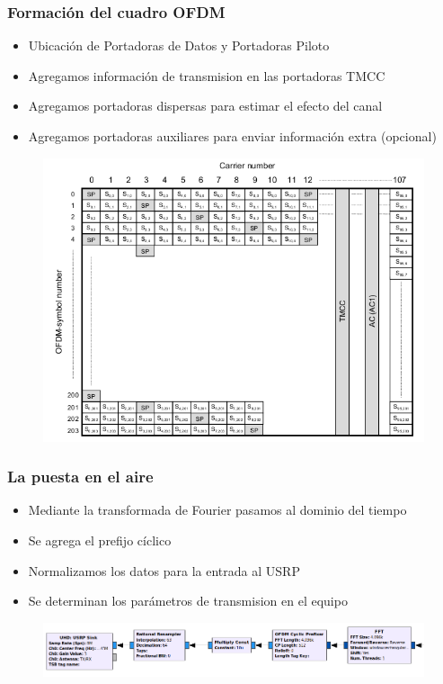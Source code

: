 \begin{frame}
\frametitle{Formación del cuadro OFDM}
\begin{itemize}	
	\item { Ubicación de Portadoras de Datos y Portadoras Piloto}
	\item {	Agregamos información de transmision en las portadoras TMCC}
	\item { Agregamos portadoras dispersas para estimar el efecto del canal }
	\item { Agregamos portadoras auxiliares para enviar información extra (opcional) }
\end{itemize}
\begin{figure}
	\includegraphics[scale=0.3]{ofdm_frame}
\end{figure}
\end{frame}
\begin{frame}
\frametitle{La puesta en el aire}
\begin{itemize}	
	\item { Mediante la transformada de Fourier pasamos al dominio del tiempo}
	\item {	Se agrega el prefijo cíclico}
	\item { Normalizamos los datos para la entrada al USRP }
	\item { Se determinan los parámetros de transmision en el equipo }
\end{itemize}
\begin{figure}
	\includegraphics[scale=0.3]{final_tx}
\end{figure}
\end{frame}